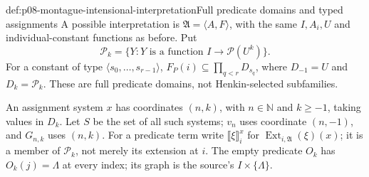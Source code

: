 \begin{hbdefinition}{def:p08-montague-intensional-interpretation}{Full predicate domains and typed assignments}
A possible interpretation is \(\mathfrak A=\langle A,F\rangle\),
with the same \(I,A_i,U\) and individual-constant functions as before.
Put
\[
 \mathcal P_k=\{Y:Y\text{ is a function }I\to\mathcal P(U^k)\}.
\]
For a constant of type \(\langle s_0,\ldots,s_{r-1}\rangle\),
\(F_P(i)\subseteq\prod_{q<r}D_{s_q}\), where
\(D_{-1}=U\) and \(D_k=\mathcal P_k\). These are full predicate
domains, not Henkin-selected subfamilies.

An assignment system \(x\) has coordinates \((n,k)\), with
\(n\in\mathbb N\) and \(k\geq-1\), taking values in \(D_k\).
Let \(S\) be the set of all such systems; \(v_n\) uses coordinate
\((n,-1)\), and \(G_{n,k}\) uses \((n,k)\).
For a predicate term write \(\llbracket\xi\rrbracket_i^x\) for
\(\operatorname{Ext}_{i,\mathfrak A}(\xi)(x)\); it is a member of
\(\mathcal P_k\), not merely its extension at \(i\).
The empty predicate \(O_k\) has \(O_k(j)=\Lambda\) at every index;
its graph is the source's \(I\times\{\Lambda\}\).
\end{hbdefinition}

